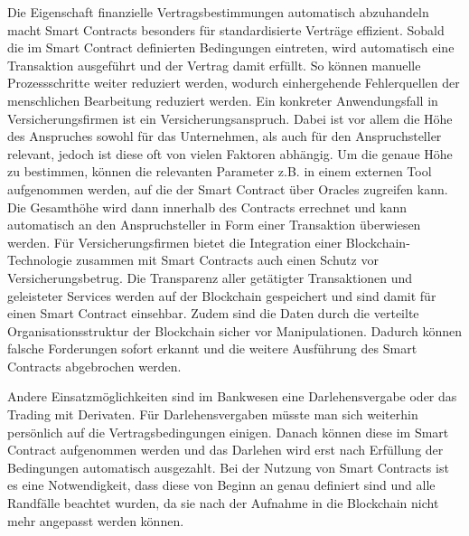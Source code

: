 Die Eigenschaft finanzielle Vertragsbestimmungen automatisch abzuhandeln macht Smart Contracts 
besonders für standardisierte Verträge effizient. Sobald die im Smart Contract definierten Bedingungen
eintreten, wird automatisch eine Transaktion ausgeführt und der Vertrag damit erfüllt.
So können manuelle Prozessschritte weiter reduziert werden, wodurch einhergehende Fehlerquellen
der menschlichen Bearbeitung reduziert werden. 
Ein konkreter Anwendungsfall in Versicherungsfirmen ist ein Versicherungsanspruch.
\cite[p.~168f]{chowdhary2025smart}
Dabei ist vor allem die Höhe des Anspruches sowohl für das Unternehmen, als auch für den
Anspruchsteller relevant, jedoch ist diese oft von vielen Faktoren abhängig. Um die genaue Höhe zu bestimmen,
können die relevanten Parameter z.B. in einem externen Tool aufgenommen werden, auf die der Smart Contract
über Oracles zugreifen kann. Die Gesamthöhe wird dann innerhalb des Contracts errechnet und kann automatisch
an den Anspruchsteller in Form einer Transaktion überwiesen werden. 
Für Versicherungsfirmen bietet die Integration einer Blockchain-Technologie zusammen mit Smart Contracts
auch einen Schutz vor Versicherungsbetrug. Die Transparenz aller getätigter Transaktionen
und geleisteter Services werden auf der Blockchain gespeichert und sind damit für einen Smart Contract
einsehbar. Zudem sind die Daten durch die verteilte Organisationsstruktur der Blockchain sicher vor 
Manipulationen. 
Dadurch können falsche Forderungen sofort erkannt und die weitere Ausführung des Smart
Contracts abgebrochen werden.
\cite[p.~10]{chenthara2021privacy}

Andere Einsatzmöglichkeiten sind im Bankwesen eine Darlehensvergabe oder das Trading
mit Derivaten. \cite[p.~168f]{chowdhary2025smart}
Für Darlehensvergaben müsste man sich weiterhin persönlich auf die Vertragsbedingungen 
einigen. Danach können diese im Smart Contract aufgenommen werden und das Darlehen wird 
erst nach Erfüllung der Bedingungen automatisch ausgezahlt.
\cite{Gronemann2018darlehen}
Bei der Nutzung von Smart Contracts ist es eine Notwendigkeit, dass diese von Beginn an genau 
definiert sind und alle Randfälle beachtet wurden, da sie nach der Aufnahme in die Blockchain 
nicht mehr angepasst werden können. 

\cite[p.~58]{fill2020blockchain}





